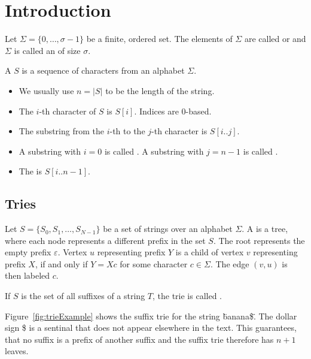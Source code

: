 \chapter{Introduction}

\begin{Definition}
  Let $\Sigma = \{0, \ldots, \sigma - 1\}$ be a finite, ordered set. The elements of $\Sigma$ are called  or  and $\Sigma$ is called an  of size $\sigma$.
\end{Definition}

\begin{Definition}
  A  $S$ is a sequence of characters from an alphabet $\Sigma$.
  \begin{itemize}
    \item We usually use $n = \vert S \vert$ to be the length of the string.
    \item The $i$-th character of $S$ is $S[i]$. Indices are $0$-based.
    \item The substring from the $i$-th to the $j$-th character is $S[i..j]$.
    \item A substring with $i = 0$ is called . A substring with $j = n - 1$ is called .
    \item The  is $S[i..n-1]$.
  \end{itemize}
\end{Definition}

\section{Tries}

\begin{Definition}
  Let $S = \{S_0, S_1, \ldots, S_{N-1}\}$ be a set of strings over an alphabet $\Sigma$. A  is a tree, where each node represents a different prefix in the set $S$. The root represents the empty prefix $\varepsilon$. Vertex $u$ representing prefix $Y$ is a child of vertex $v$ representing prefix $X$, if and only if $Y = Xc$ for some character $c \in \Sigma$. The edge $(v,u)$ is then labeled $c$.

  If $S$ is the set of all suffixes of a string $T$, the trie is called .
\end{Definition}

\begin{Example}
  Figure~\ref{fig:trieExample} shows the suffix trie for the string \"banana\$\". The dollar sign \$ is a sentinal that does not appear elsewhere in the text. This guarantees, that no suffix is a prefix of another suffix and the suffix trie therefore has $n+1$ leaves.
\end{Example}
